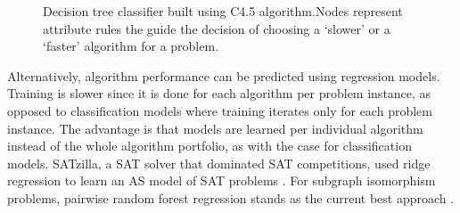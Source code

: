 \begin{figure}[H]
	\centering
	\caption[Decision tree classifier built using C4.5 algorithm]{Decision tree classifier built using C4.5 algorithm.Nodes represent attribute rules the guide the decision of choosing a ‘slower’ or a ‘faster’ algorithm for a problem. \citep{gent2010learning}}
	\label{fig:decisiontree}
\end{figure}

Alternatively, algorithm performance can be predicted using regression models. Training is slower since it is done for each algorithm per problem instance, as opposed to classification models where training iterates only for each problem instance. The advantage is that models are learned per individual algorithm instead of the whole algorithm portfolio, as with the case for classification models. SATzilla, a SAT solver that dominated SAT competitions, used ridge regression to learn an AS model of SAT problems \citep{xu2008satzilla}. For subgraph isomorphism problems, pairwise random forest regression stands as the current best approach \citet{kotthoff2016portfolios}. 

